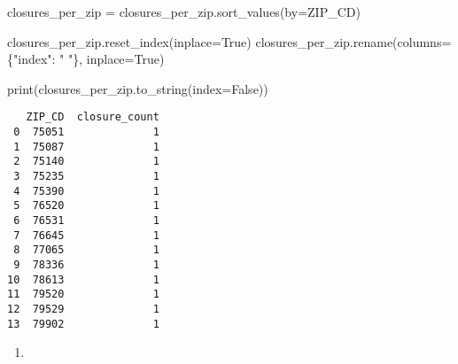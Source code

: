 \documentclass[
  letterpaper,
  DIV=11,
  numbers=noendperiod]{scrartcl}
\newenvironment{Shaded}{\begin{snugshade}}{\end{snugshade}}
\newcommand{\BuiltInTok}[1]{\textcolor[rgb]{0.00,0.23,0.31}{#1}}
\newcommand{\NormalTok}[1]{\textcolor[rgb]{0.00,0.23,0.31}{#1}}
\newcommand{\OperatorTok}[1]{\textcolor[rgb]{0.37,0.37,0.37}{#1}}
\newcommand{\StringTok}[1]{\textcolor[rgb]{0.13,0.47,0.30}{#1}}
\newcommand{\VariableTok}[1]{\textcolor[rgb]{0.07,0.07,0.07}{#1}}
\providecommand{\tightlist}{%
  \setlength{\itemsep}{0pt}\setlength{\parskip}{0pt}}\usepackage{longtable,booktabs,array}
\begin{document}
\begin{Shaded}
\begin{Highlighting}[]
\NormalTok{closures\_per\_zip }\OperatorTok{=}\NormalTok{ closures\_per\_zip.sort\_values(by}\OperatorTok{=}\StringTok{\textquotesingle{}ZIP\_CD\textquotesingle{}}\NormalTok{)}

\NormalTok{closures\_per\_zip.reset\_index(inplace}\OperatorTok{=}\VariableTok{True}\NormalTok{)}
\NormalTok{closures\_per\_zip.rename(columns}\OperatorTok{=}\NormalTok{\{}\StringTok{"index"}\NormalTok{: }\StringTok{" "}\NormalTok{\}, inplace}\OperatorTok{=}\VariableTok{True}\NormalTok{)}

\BuiltInTok{print}\NormalTok{(closures\_per\_zip.to\_string(index}\OperatorTok{=}\VariableTok{False}\NormalTok{))}
\end{Highlighting}
\end{Shaded}

\begin{verbatim}
   ZIP_CD  closure_count
 0  75051              1
 1  75087              1
 2  75140              1
 3  75235              1
 4  75390              1
 5  76520              1
 6  76531              1
 7  76645              1
 8  77065              1
 9  78336              1
10  78613              1
11  79520              1
12  79529              1
13  79902              1
\end{verbatim}

\begin{enumerate}
\def\labelenumi{\arabic{enumi}.}
\setcounter{enumi}{1}
\tightlist
\item
\end{enumerate}
\end{document}
